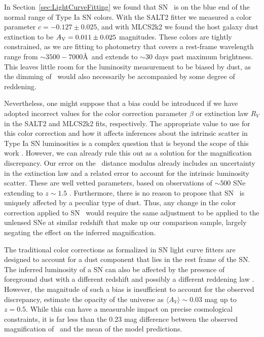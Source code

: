 In Section~\ref{sec:LightCurveFitting} we found that SN \tomas\ is on
the blue end of the normal range of Type Ia SN colors.  With the SALT2
fitter we measured a color parameter $c=-0.127\pm0.025$, and with
MLCS2k2 we found the host galaxy dust extinction to be $A_{\rm
V}=0.011\pm0.025$ magnitudes.  These colors are tightly constrained,
as we are fitting to photometry that covers a rest-frame wavelength
range from $\sim3500-7000$\AA\ and extends to $\sim$30 days past
maximum brightness.  This leaves little room for the luminosity
measurement to be biased by dust, as the dimming of \tomas\ would also
necessarily be accompanied by some degree of reddening. 

Nevertheless, one might suppose that a bias could be introduced if we
have adopted incorrect values for the color correction parameter
$\beta$ or extinction law $R_V$ in the SALT2 and MLCS2k2 fits,
respectively.  The appropriate value to use for this color correction
and how it affects inferences about the intrinsic scatter in Type Ia
SN luminosities is a complex question that is beyond the scope of this
work \citep[see
e.g.][]{Marriner:2011,Chotard:2011,Kessler:2013,Scolnic:2014a}.
However, we can already rule this out as a solution for the
magnification discrepancy.  Our error on the \tomas\ distance modulus
already includes an uncertainty in the extinction law and a related
error to account for the intrinsic luminosity scatter. These are well
vetted parameters, based on observations of $\sim500$ SNe extending
to $z\sim1.5$ \citep{Sullivan:2011}.  Furthermore, there is no reason
to propose that SN \tomas\ is uniquely affected by a peculiar type of
dust.  Thus, any change in the color correction applied to SN \tomas\
would require the same adjustment to be applied to the unlensed SNe at
similar redshift that make up our comparison sample, largely negating
the effect on the inferred magnification. 

The traditional color corrections as formalized in SN light curve
fitters are designed to account for a dust component that lies in the
rest frame of the SN.  The inferred luminosity of a SN can also be
affected by the presence of foreground dust with a different redshift
and possibly a different reddening law \citep{Menard:2010b}.  However,
the magnitude of such a bias is insufficient to account for the
observed discrepancy, \citet{Menard:2010a} estimate the opacity of the
universe as $\langle A_{V}\rangle\sim0.03$ mag up to $z=0.5$.  While
this can have a measurable impact on precise cosmological constraints,
it is far less than the 0.23 mag difference between the observed
magnification of \tomas\ and the mean of the model predictions.  


